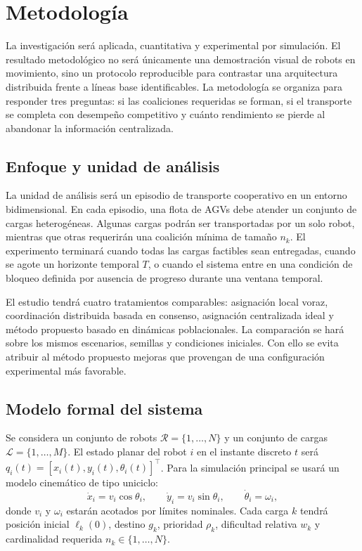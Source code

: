 \documentclass[11pt,a4paper]{article}
\begin{document}
\section{Metodología}

La investigación será aplicada, cuantitativa y experimental por simulación. El resultado metodológico no será únicamente una demostración visual de robots en movimiento, sino un protocolo reproducible para contrastar una arquitectura distribuida frente a líneas base identificables. La metodología se organiza para responder tres preguntas: si las coaliciones requeridas se forman, si el transporte se completa con desempeño competitivo y cuánto rendimiento se pierde al abandonar la información centralizada.

\subsection{Enfoque y unidad de análisis}

La unidad de análisis será un episodio de transporte cooperativo en un entorno bidimensional. En cada episodio, una flota de AGVs debe atender un conjunto de cargas heterogéneas. Algunas cargas podrán ser transportadas por un solo robot, mientras que otras requerirán una coalición mínima de tamaño $n_k$. El experimento terminará cuando todas las cargas factibles sean entregadas, cuando se agote un horizonte temporal $T$, o cuando el sistema entre en una condición de bloqueo definida por ausencia de progreso durante una ventana temporal.

El estudio tendrá cuatro tratamientos comparables: asignación local voraz, coordinación distribuida basada en consenso, asignación centralizada ideal y método propuesto basado en dinámicas poblacionales. La comparación se hará sobre los mismos escenarios, semillas y condiciones iniciales. Con ello se evita atribuir al método propuesto mejoras que provengan de una configuración experimental más favorable.

\subsection{Modelo formal del sistema}

Se considera un conjunto de robots $\mathcal{R}=\{1,\ldots,N\}$ y un conjunto de cargas $\mathcal{L}=\{1,\ldots,M\}$. El estado planar del robot $i$ en el instante discreto $t$ será $q_i(t)=[x_i(t),y_i(t),\theta_i(t)]^\top$. Para la simulación principal se usará un modelo cinemático de tipo uniciclo:
\[
\dot{x}_i=v_i\cos\theta_i,\qquad
\dot{y}_i=v_i\sin\theta_i,\qquad
\dot{\theta}_i=\omega_i ,
\]
donde $v_i$ y $\omega_i$ estarán acotados por límites nominales. Cada carga $k$ tendrá posición inicial $\ell_k(0)$, destino $g_k$, prioridad $\rho_k$, dificultad relativa $w_k$ y cardinalidad requerida $n_k\in\{1,\ldots,N\}$.
\end{document}

